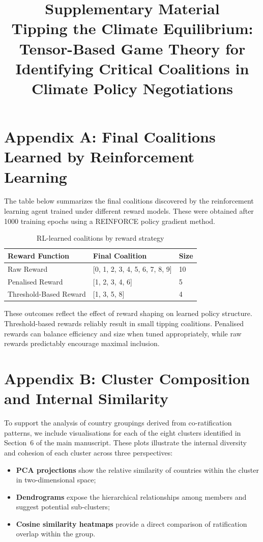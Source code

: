 \documentclass[11pt]{article}
\title{\textbf{Supplementary Material}\\[0.5em]
\large Tipping the Climate Equilibrium: Tensor-Based Game Theory for Identifying Critical Coalitions in Climate Policy Negotiations}
\author{}
\date{}
\begin{document}
\maketitle

\section*{Appendix A: Final Coalitions Learned by Reinforcement Learning}
\label{app:rl_coalitions}

The table below summarizes the final coalitions discovered by the reinforcement learning agent trained under different reward models. These were obtained after 1000 training epochs using a REINFORCE policy gradient method.

\begin{table}[H]
	\centering
	\caption{RL-learned coalitions by reward strategy}
	\label{tab:rl_coalitions}
	\begin{tabular}{lll}
		\toprule
		\textbf{Reward Function} & \textbf{Final Coalition} & \textbf{Size} \\
		\midrule
		Raw Reward               & [0, 1, 2, 3, 4, 5, 6, 7, 8, 9] & 10 \\
		Penalised Reward         & [1, 2, 3, 4, 6]               & 5 \\
		Threshold-Based Reward   & [1, 3, 5, 8]                  & 4 \\
		\bottomrule
	\end{tabular}
\end{table}

These outcomes reflect the effect of reward shaping on learned policy structure. Threshold-based rewards reliably result in small tipping coalitions. Penalised rewards can balance efficiency and size when tuned appropriately, while raw rewards predictably encourage maximal inclusion.


\section*{Appendix B: Cluster Composition and Internal Similarity}
\label{app:cluster_visuals}

To support the analysis of country groupings derived from co-ratification patterns, we include visualisations for each of the eight clusters identified in Section~6 of the main manuscript. These plots illustrate the internal diversity and cohesion of each cluster across three perspectives:

\begin{itemize}
	\item \textbf{PCA projections} show the relative similarity of countries within the cluster in two-dimensional space;
	\item \textbf{Dendrograms} expose the hierarchical relationships among members and suggest potential sub-clusters;
	\item \textbf{Cosine similarity heatmaps} provide a direct comparison of ratification overlap within the group.
\end{itemize}
\end{document}

